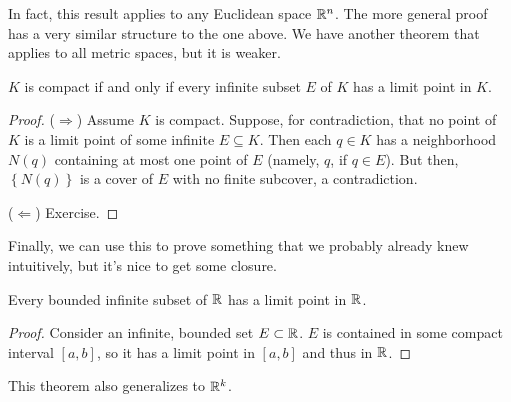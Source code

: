 \documentclass[../m131main.tex]{subfiles}
\begin{document}
In fact, this result applies to any Euclidean space $\mathbb{R}^n$.
The more general proof has a very similar structure to the one above.
We have another theorem that applies to all metric spaces, but it is weaker.

\begin{theorem}[]
    $K$ is compact if and only if every infinite subset $E$ of $K$ has a limit point in $K$.
\end{theorem}

\begin{proof}
    ($\Rightarrow$)
    Assume $K$ is compact.
    Suppose, for contradiction, that no point of $K$ is a limit point of some infinite $E \subseteq K$.
    Then each $q \in K$ has a neighborhood $N(q)$ containing at most one point of $E$ (namely, $q$, if $q \in E$).
    But then, $\left\{ N(q) \right\}$ is a cover of $E$ with no finite subcover, a contradiction.

    ($\Leftarrow$) Exercise.
\end{proof}

Finally, we can use this to prove something that we probably already knew intuitively, but it's nice to get some closure.

\begin{corollary}
    Every bounded infinite subset of $\mathbb{R}$ has a limit point in $\mathbb{R}$.
\end{corollary}

\begin{proof}
    Consider an infinite, bounded set $E \subset \mathbb{R}$.
    $E$ is contained in some compact interval $[a,b]$, so it has a limit point in $[a,b]$ and thus in $\mathbb{R}$.
\end{proof}

This theorem also generalizes to $\mathbb{R}^k$.

\end{document}

